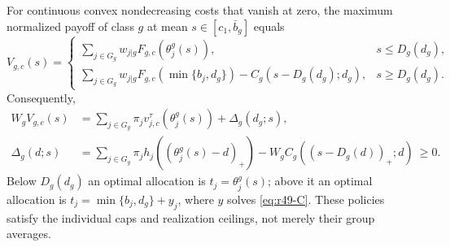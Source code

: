 \begin{theorem}\label{thm:r49-pooling}
For continuous convex nondecreasing costs that vanish at zero, the maximum normalized payoff of class $g$ at mean $s\in[c_1,\bar b_g]$ equals
\begin{equation}\label{eq:r49-value}
 V_{g,c}(s)=
 \begin{cases}
 \displaystyle\sum_{j\in G_g}w_{j|g}F_{g,c}(\theta_j^g(s)),&s\leq D_g(d_g),\\[1mm]
 \displaystyle\sum_{j\in G_g}w_{j|g}F_{g,c}(\min\{b_j,d_g\})
       -C_g(s-D_g(d_g);d_g),&s\geq D_g(d_g).
 \end{cases}
\end{equation}
Consequently,
\begin{align}
 W_gV_{g,c}(s)
 &=\sum_{j\in G_g}\pi_jv_{j,c}^{\tau}(\theta_j^g(s))
       +\Delta_g(d_g;s),\label{eq:r49-correction}\\
 \Delta_g(d;s)
 &=\sum_{j\in G_g}\pi_jh_j((\theta_j^g(s)-d)_+)
   -W_g C_g((s-D_g(d))_+;d)\ \geq0.\label{eq:r49-delta}
\end{align}
Below $D_g(d_g)$ an optimal allocation is $t_j=\theta_j^g(s)$; above it an optimal allocation is $t_j=\min\{b_j,d_g\}+y_j$, where $y$ solves \eqref{eq:r49-C}. These policies satisfy the individual caps and realization ceilings, not merely their group averages.
\end{theorem}
